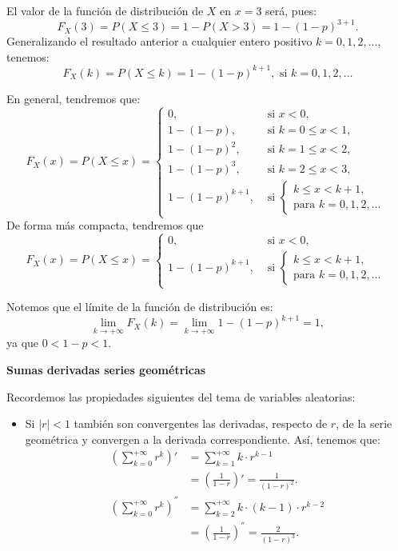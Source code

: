 \documentclass[]{book}
\providecommand{\tightlist}{%
  \setlength{\itemsep}{0pt}\setlength{\parskip}{0pt}}
\begin{document}
El valor de la función de distribución de \(X\) en \(x=3\) será, pues:
\[F_X(3)=P(X\leq 3)=1-P(X>3)=1-(1-p)^{3+1}.\]
Generalizando el resultado anterior a cualquier entero positivo \(k=0,1,2,\ldots\), tenemos:
\[F_X(k)=P(X\leq k)=1-(1-p)^{k+1},\mbox{ si } k=0,1,2,\ldots\]

En general, tendremos que:
\[
F_X(x)=P(X\leq x)=
\left\{\begin{array}{ll} 
0, & \mbox{ si } x<0,\\
1- (1-p),  & \mbox{ si } k=0\leq x <1,\\
1- (1-p)^2, & \mbox{ si } k=1\leq x <2,\\
1- (1-p)^3, & \mbox{ si } k=2\leq x <3,\\
1- (1-p)^{k+1}, & \mbox{ si } \left\{ \begin{array}{l}k\leq x< k+1,\\\mbox{para } k=0,1,2,\ldots\end{array}
    \right.\end{array}\right.
\]
De forma más compacta, tendremos que
\[
F_X(x)=P(X\leq x)=
\left\{\begin{array}{ll} 
0, & \mbox{ si } x<0,\\
1- (1-p)^{k+1}, & \mbox{ si } \left\{ \begin{array}{l}k\leq x< k+1,\\\mbox{para } k=0,1,2,\ldots\end{array}
    \right.\end{array}
    \right.
\]

Notemos que el límite de la función de distribución es:
\[
\displaystyle\lim_{k\to +\infty } F_X(k)=\lim_{k\to +\infty } 1-(1-p)^{k+1}=
1,
\]
ya que \(0<1-p<1\).

\textbf{Sumas derivadas series geométricas}

Recordemos las propiedades siguientes del tema de variables aleatorias:

\begin{itemize}
\tightlist
\item
  Si \(|r|<1\) también son convergentes las derivadas, respecto de \(r\), de la serie geométrica y convergen a la derivada correspondiente. Así, tenemos que:
  \[
  \begin{array}{ll}
  \left(\sum_{k=0}^{+\infty} r^k\right)' &= \sum_{k=1}^{+\infty}k\cdot
  r^{k-1}\\
  &= \left(\frac{1}{1-r}\right)'=\frac{1}{(1-r)^2}.\\
  \left(\sum_{k=0}^{+\infty} r^k\right)^{''} &= \sum_{k=2}^{+\infty}k \cdot(k-1)\cdot r^{k-2} \\
  &= \left(\frac{1}{1-r}\right)^{''}=\frac{2}{(1-r)^3}.
  \end{array}
  \]
\end{itemize}
\end{document}
